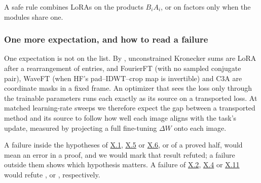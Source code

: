 \begin{explains}
A safe rule combines LoRAs on the products $B_iA_i$, or on factors only when the modules share one.
\end{explains}

\subsubsection{One more expectation, and how to read a failure}\label{sec:predictions-failure}

One expectation is not on the list. By , unconstrained Kronecker sums are LoRA after a
rearrangement of entries, and FourierFT (with no sampled conjugate pair), WaveFT (when HF's pad--IDWT--crop map is
invertible) and C3A are coordinate masks in a fixed frame. An optimizer that sees the loss only through the trainable
parameters runs each exactly as its source on a transported loss. At matched learning-rate sweeps we therefore expect the
gap between a transported method and its source to follow how well each image aligns with the task's update, measured by
projecting a full fine-tuning $\Delta W$ onto each image.

A failure inside the hypotheses of \hyperref[res:X.1]{X.1}, \hyperref[res:X.5]{X.5} or \hyperref[res:X.6]{X.6}, or of a
proved half, would mean an error in a proof, and we would mark that result refuted; a failure outside them shows which
hypothesis matters. A failure of \hyperref[res:X.2]{X.2}, \hyperref[res:X.4]{X.4} or \hyperref[res:X.11]{X.11} would
refute ,  or , respectively.
